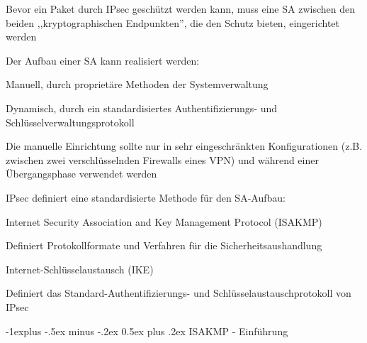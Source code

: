 \documentclass[a4paper]{article}
\makeatletter
\renewcommand{\subsection}{\@startsection{subsection}{2}{0mm}%
 {-1explus -.5ex minus -.2ex}%
 {0.5ex plus .2ex}%
 {\normalfont\normalsize\bfseries}}
\makeatother
\begin{document}
\begin{multicols}{3}
      \begin{itemize*}
            \item Bevor ein Paket durch IPsec geschützt werden kann, muss eine SA
            zwischen den beiden ,,kryptographischen Endpunkten'', die den Schutz
            bieten, eingerichtet werden
            \item Der Aufbau einer SA kann realisiert werden:
            \begin{itemize*}
                  \item Manuell, durch proprietäre Methoden der Systemverwaltung
                  \item Dynamisch, durch ein standardisiertes Authentifizierungs- und Schlüsselverwaltungsprotokoll
                  \item Die manuelle Einrichtung sollte nur in sehr eingeschränkten Konfigurationen (z.B. zwischen zwei verschlüsselnden Firewalls eines VPN) und während einer Übergangsphase verwendet werden
            \end{itemize*}
            \item IPsec definiert eine standardisierte Methode für den SA-Aufbau:
            \begin{itemize*}
                  \item Internet Security Association and Key Management Protocol (ISAKMP)
                  \begin{itemize*} \item Definiert Protokollformate und Verfahren für die Sicherheitsaushandlung \end{itemize*}
                  \item Internet-Schlüsselaustausch (IKE)
                  \begin{itemize*} \item Definiert das Standard-Authentifizierungs- und Schlüsselaustauschprotokoll von IPsec \end{itemize*}
            \end{itemize*}
      \end{itemize*}


      \subsection{ISAKMP - Einführung}


\end{multicols}
\end{document}
